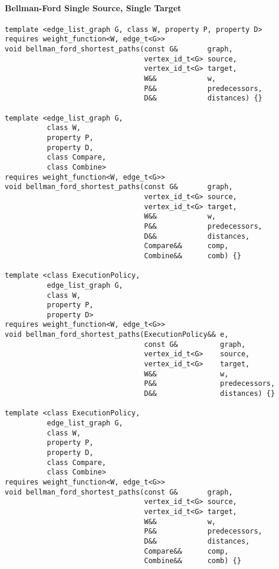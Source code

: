 \paragraph{Bellman-Ford Single Source, Single Target}
\begin{lstlisting}
template <edge_list_graph G, class W, property P, property D>
requires weight_function<W, edge_t<G>>
void bellman_ford_shortest_paths(const G&       graph,
                                 vertex_id_t<G> source,
                                 vertex_id_t<G> target,
                                 W&&            w,
                                 P&&            predecessors,
                                 D&&            distances) {}

template <edge_list_graph G,
          class W,
          property P,
          property D,
          class Compare,
          class Combine>
requires weight_function<W, edge_t<G>>
void bellman_ford_shortest_paths(const G&       graph,
                                 vertex_id_t<G> source,
                                 vertex_id_t<G> target,
                                 W&&            w,
                                 P&&            predecessors,
                                 D&&            distances,
                                 Compare&&      comp,
                                 Combine&&      comb) {}

template <class ExecutionPolicy,
          edge_list_graph G,
          class W,
          property P,
          property D>
requires weight_function<W, edge_t<G>>
void bellman_ford_shortest_paths(ExecutionPolicy&& e,
                                 const G&          graph,
                                 vertex_id_t<G>    source,
                                 vertex_id_t<G>    target,
                                 W&&               w,
                                 P&&               predecessors,
                                 D&&               distances) {}

template <class ExecutionPolicy,
          edge_list_graph G,
          class W,
          property P,
          property D,
          class Compare,
          class Combine>
requires weight_function<W, edge_t<G>>
void bellman_ford_shortest_paths(const G&       graph,
                                 vertex_id_t<G> source,
                                 vertex_id_t<G> target,
                                 W&&            w,
                                 P&&            predecessors,
                                 D&&            distances,
                                 Compare&&      comp,
                                 Combine&&      comb) {}

\end{lstlisting}


